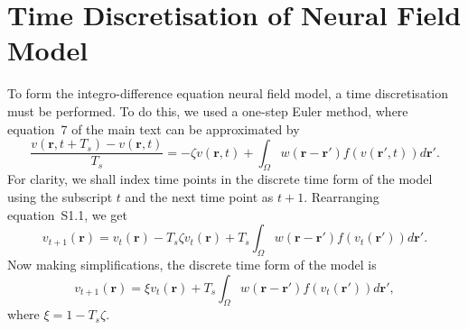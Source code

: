 \documentclass[]{article}
\begin{document}
\section*{Time Discretisation of Neural Field Model}\label{Time Discretization} To form the integro-difference equation neural field model, a time discretisation must be performed. To do this, we used a one-step Euler method, where equation~7 of the main text can be approximated by 
\begin{equation}
	\label{Euler Approximation}\frac{v\left( \mathbf{r},t+T_s \right) - v\left( \mathbf{r},t\right)}{T_s} =-\zeta v\left( \mathbf{r},t \right) + \int_\Omega {w\left( \mathbf{r}-\mathbf{r}' \right)f\left( {v\left( \mathbf{r}',t \right)} \right)d\mathbf{r}'}. 
\end{equation}
For clarity, we shall index time points in the discrete time form of the model using the subscript $t$ and the next time point as $t+1$. Rearranging equation~S1.1, we get 
\begin{equation}
	\label{Euler Approximation2} v_{t+1}\left( \mathbf{r}\right) = v_t\left( \mathbf{r}\right) -T_s \zeta v_t\left( \mathbf{r}\right) + T_s \int_\Omega {w\left( \mathbf{r}-\mathbf{r}' \right)f\left( {v_t\left( \mathbf{r}'\right)} \right)d\mathbf{r}'}. 
\end{equation}
Now making simplifications, the discrete time form of the model is 
\begin{equation}
	\label{Discrete Time Model1}v_{t+1}\left(\mathbf{r}\right) = \xi v_t\left(\mathbf{r}\right) + T_s \int_\Omega { w\left(\mathbf{r}-\mathbf{r}'\right) f\left(v_t\left(\mathbf{r}'\right)\right) d\mathbf{r}'}, 
\end{equation}
where $\xi = 1 - T_s \zeta$.
\end{document}

